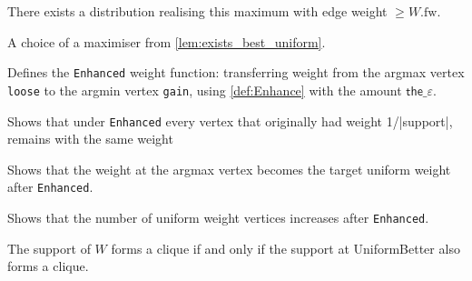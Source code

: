 \begin{lemma}
  \label{lem:exists_best_uniform}
  \leanok
  There exists a distribution realising this maximum with edge weight $\ge W.\mathrm{fw}$.
\end{lemma}

\begin{definition}[UniformBetter]
  \label{def:UniformBetter}
  \leanok
  A choice of a maximiser from \autoref{lem:exists_best_uniform}.
\end{definition}

\begin{definition}[Enhanced]
  \label{def:Enhanced}
  \leanok
  Defines the \verb|Enhanced| weight function: transferring weight from the argmax vertex \verb|loose| to the argmin vertex \verb|gain|, using \autoref{def:Enhance} with the amount \(\mathsf{the\_\varepsilon}\).
\end{definition}

\begin{lemma}
    \label{lem:Enhanced_unaffected}
    Shows that under \verb|Enhanced| every vertex that originally had weight 1/|support|, remains with the same weight
\end{lemma}

\begin{lemma}
    \label{lem:Enhanced_effect_argmax}
    Shows that the weight at the argmax vertex becomes the target uniform weight after \verb|Enhanced|.
\end{lemma}

\begin{lemma}
    \label{lem:Enhanced_inc_uniform_count}
    Shows that the number of uniform weight vertices increases after \verb|Enhanced|.
\end{lemma}

\begin{lemma}
    \label{lem:UniformBetter_support_equiv}
    \leanok
    The support of $W$ forms a clique if and only if the support at UniformBetter also forms a clique.
\end{lemma}

